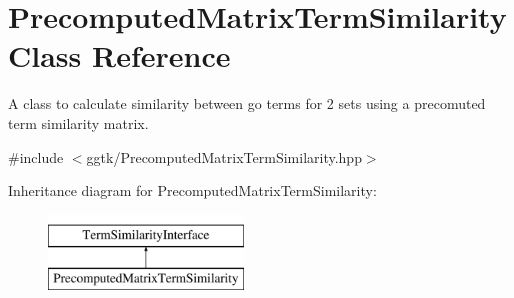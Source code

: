 \hypertarget{classPrecomputedMatrixTermSimilarity}{}\section{Precomputed\+Matrix\+Term\+Similarity Class Reference}
\label{classPrecomputedMatrixTermSimilarity}


A class to calculate similarity between go terms for 2 sets using a precomuted term similarity matrix.  




{\ttfamily \#include $<$ggtk/\+Precomputed\+Matrix\+Term\+Similarity.\+hpp$>$}

Inheritance diagram for Precomputed\+Matrix\+Term\+Similarity\+:\begin{figure}[H]
\begin{center}
\leavevmode
\includegraphics[height=2.000000cm]{classPrecomputedMatrixTermSimilarity}
\end{center}
\end{figure}
